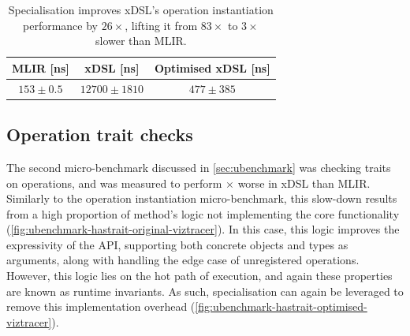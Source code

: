\begin{table}[H]
  \caption{Specialisation improves xDSL's operation instantiation performance by $26\times$, lifting it from $83\times$ to $3\times$ slower than MLIR.}
  \label{tab:ubenchmark-instantiation-optimised}
  \centering
  \begin{tabular}{ccc}
    \toprule
    \textbf{MLIR [ns]} & \textbf{xDSL [ns]} & \textbf{Optimised xDSL [ns]} \\
    \midrule
    $153 \pm 0.5$ & $12700 \pm 1810$ & $477 \pm 385$ \\
    \bottomrule
  \end{tabular}
\end{table}









\subsection{Operation trait checks}
\label{ssec:specialising-ubenchmarks-trait}

The second micro-benchmark discussed in \autoref{sec:ubenchmark} was checking traits on operations, and was measured to perform $\times$ worse in xDSL than MLIR.
Similarly to the operation instantiation micro-benchmark, this slow-down results from a high proportion of method's logic not implementing the core functionality (\autoref{fig:ubenchmark-hastrait-original-viztracer}). In this case, this logic improves the expressivity of the API, supporting both concrete objects and types as arguments, along with handling the edge case of unregistered operations. However, this logic lies on the hot path of execution, and again these properties are known as runtime invariants. As such, specialisation can again be leveraged to remove this implementation overhead (\autoref{fig:ubenchmark-hastrait-optimised-viztracer}).

